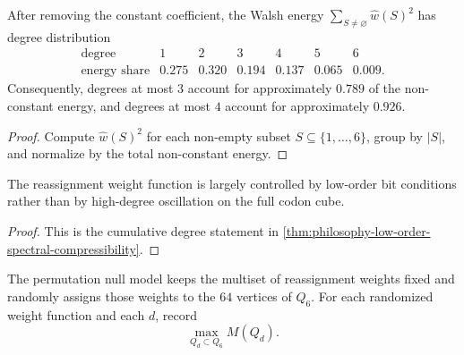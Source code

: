 \begin{theorem}
\label{thm:philosophy-low-order-spectral-compressibility}
After removing the constant coefficient, the Walsh energy
$\sum_{S\neq\varnothing}\widehat{w}(S)^{2}$ has degree distribution
$$
\begin{array}{c|rrrrrr}
  \text{degree} & 1 & 2 & 3 & 4 & 5 & 6\\
\hline
  \text{energy share}
    & 0.275 & 0.320 & 0.194 & 0.137 & 0.065 & 0.009.
\end{array}
$$
Consequently, degrees at most $3$ account for approximately $0.789$ of
the non-constant energy, and degrees at most $4$ account for
approximately $0.926$.
\end{theorem}
\begin{proof}
Compute $\widehat{w}(S)^{2}$ for each non-empty subset
$S\subseteq\{1,\ldots,6\}$, group by $|S|$, and normalize by the total
non-constant energy.
\end{proof}

\begin{corollary}
\label{cor:philosophy-reassignment-weight-low-order}
The reassignment weight function is largely controlled by low-order bit
conditions rather than by high-degree oscillation on the full codon
cube.
\end{corollary}
\begin{proof}
This is the cumulative degree statement in
\autoref{thm:philosophy-low-order-spectral-compressibility}.
\end{proof}

\begin{definition}
\label{def:philosophy-weight-permutation-null-model}
The permutation null model keeps the multiset of reassignment weights
fixed and randomly assigns those weights to the $64$ vertices of $Q_{6}$.
For each randomized weight function and each $d$, record
$$
  \max_{Q_{d}\subset Q_{6}}M(Q_{d}).
$$
\end{definition}

